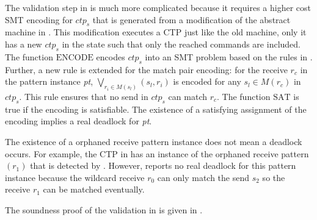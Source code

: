 The validation step in  is much more complicated because it requires a higher cost SMT encoding for $\mathit{ctp_s}$ that is generated from a modification of the abstract machine in .
This modification executes a CTP just like the old machine, only it has a new $\mathit{ctp_s}$ in the state such that only the reached commands are included. 
The function $\mathrm{ENCODE}$ encodes $\mathit{ctp_s}$ into an SMT problem based on the rules in \cite{DBLP:conf/kbse/HuangMM13}. Further, a new rule is extended for the match pair encoding: for the receive $\mathit{r_c}$ in the pattern instance \textit{pt}, $\bigvee_{\mathit{r_i}\in\mathit{M}(\mathit{s_l})}(\mathit{s_l},\mathit{r_i})$ is encoded for any $\mathit{s_l}\in\mathit{M}(\mathit{r_c})$ in $\mathit{ctp_s}$. This rule ensures that no send in $\mathit{ctp_s}$ can match $\mathit{r_c}$. The function $\mathrm{SAT}$ is true if the encoding is satisfiable. The existence of a satisfying assignment of the encoding implies a real deadlock for \textit{pt}. 

\examplefigtwo

The existence of a orphaned receive pattern instance does not mean a deadlock occurs. For example, the CTP in  has an instance of the orphaned receive pattern $(r_1)$ that is detected by . However,  reports no real deadlock for this pattern instance because the wildcard receive $r_0$ can only match the send $s_2$ so the receive $r_1$ can be matched eventually.

The soundness proof of the validation in  is given in .

